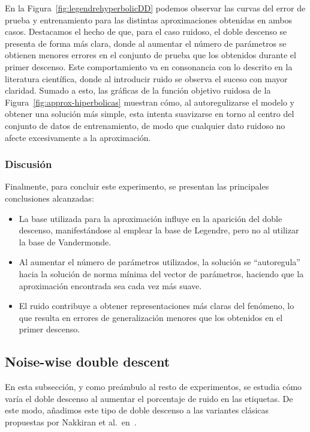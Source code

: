 En la Figura~\ref{fig:legendrehyperbolicDD} podemos observar las curvas del error de prueba y entrenamiento para las distintas aproximaciones obtenidas en ambos casos. Destacamos el hecho de que, para el caso ruidoso, el doble descenso se presenta de forma más clara, donde al aumentar el número de parámetros se obtienen menores errores en el conjunto de prueba que los obtenidos durante el primer descenso. Este comportamiento va en consonancia con lo descrito en la literatura científica, donde al introducir ruido se observa el suceso con mayor claridad. Sumado a esto, las gráficas de la función objetivo ruidosa de la Figura~\ref{fig:approx-hiperbolicas} muestran cómo, al autoregulizarse el modelo y obtener una solución más simple, esta intenta suavizarse en torno al centro del conjunto de datos de entrenamiento, de modo que cualquier dato ruidoso no afecte excesivamente a la aproximación.\newline

\subsubsection{Discusión}\label{subsubsec:discusion-polinomico}

Finalmente, para concluir este experimento, se presentan las principales conclusiones alcanzadas:

\begin{itemize}
    \item La base utilizada para la aproximación influye en la aparición del doble descenso, manifestándose al emplear la base de Legendre, pero no al utilizar la base de Vandermonde.
    \item Al aumentar el número de parámetros utilizados, la solución se ``autoregula'' hacia la solución de norma mínima del vector de parámetros, haciendo que la aproximación encontrada sea cada vez más suave.
    \item El ruido contribuye a obtener representaciones más claras del fenómeno, lo que resulta en errores de generalización menores que los obtenidos en el primer descenso.
\end{itemize}

\subsection{Noise-wise double descent}\label{subsec:noise-wise-dd}

En esta subsección, y como preámbulo al resto de experimentos, se estudia cómo varía el doble descenso al aumentar el porcentaje de ruido en las etiquetas. De este modo, añadimos este tipo de doble descenso a las variantes clásicas propuestas por Nakkiran et al.\ en~\cite{Nakkiran2019}.\newline

